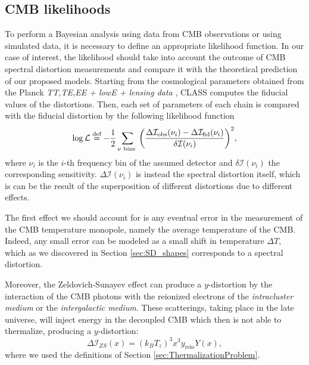 \subsection{CMB likelihoods}
To perform a Bayesian analysis using data from CMB observations or using simulated data, it is necessary to define an appropriate likelihood function. In our case of interest, the likelihood should take into account the outcome of CMB spectral distortion measurements and compare it with the theoretical prediction of our proposed models. Starting from the cosmological parameters obtained from the Planck \emph{TT,TE,EE + lowE + lensing data} \cite{planck2018results}, CLASS computes the fiducial values of the distortions. Then, each set of parameters of each chain is compared with the fiducial distortion by the following likelihood function
\begin{equation}
    \log \mathcal L\stackrel{\text{def}}{=} -\frac12 \sum_{\nu \text{ bins }}\bigg(\frac{\Delta\mathcal I_\text{obs}(\nu_i)-\Delta\mathcal I_\text{fid}(\nu_i)}{\delta \mathcal I(\nu_i)}\bigg)^2,
\end{equation}
where $\nu_i$ is the $i$-th frequency bin of the assumed detector and $\delta \mathcal I(\nu_i)$ the corresponding sensitivity. $\Delta \mathcal I(\nu_i)$ is instead the spectral distortion itself, which is can be the result of the superposition of different distortions due to different effects. 

The first effect we should account for is any eventual error in the measurement of the CMB temperature monopole, namely the average temperature of the CMB. Indeed, any small error can be modeled as a small shift in temperature $\Delta T$, which as we discovered in Section \ref{sec:SD_shapes} corresponds to a spectral distortion.

Moreover, the Zeldovich-Sunayev effect \cite{Zeldovich1972} can produce a $y$-distortion by the interaction of the CMB photons with the reionized electrons of the \emph{intracluster medium} or the \emph{intergalactic medium}. These scatterings, taking place in the late universe, will inject energy in the decoupled CMB which then is not able to thermalize, producing a $y$-distortion:
$$ \Delta \mathcal I_{ZS}(x)=(k_BT_z)^3x^3 y_\text{reio} Y(x),$$
where we used the definitions of Section \ref{sec:ThermalizationProblem}.

